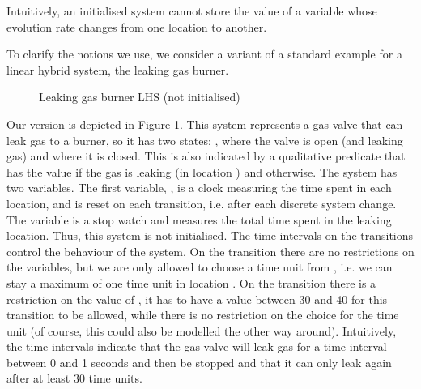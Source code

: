 \documentclass[fleqn,envcountsame]{LMCS}
\newcommand{\ie}{i.e.\xspace}
\begin{document}
Intuitively, an initialised system cannot store the value of a variable
whose evolution rate changes from one location to another.

\begin{exa}
To clarify the notions we use, we consider a variant of a standard example 
for a linear hybrid system, the leaking gas burner.

\begin{figure}
\begin{center}
\end{center}
\caption{Leaking gas burner LHS  (not initialised)}\label{leaking-not-in}
\end{figure}

Our version is depicted in Figure \ref{leaking-not-in}. 
This system represents a gas valve that can leak gas to a burner, so it has
two states: , where the valve is open (and leaking gas) and  where
it is closed. This is also indicated by a qualitative predicate  that
has the value  if the gas is leaking (in location ) and
 otherwise.
The system has two variables. The first variable, , is a clock
measuring the time spent in each location, and is reset on each transition,
\ie after each discrete system change. The variable  is a stop watch
and measures the total time spent in the leaking location.
Thus, this system is not initialised.
The time intervals on the transitions control the behaviour of the system.
On the transition  there are no restrictions on the variables, but
we are only allowed to choose a time unit from , \ie we can stay a
maximum of one time unit in location . On the transition  there 
is a restriction on the value of , it has to have a value between 30
and 40 for this transition to be allowed, while there is no restriction on
the choice for the time unit (of course, this could also be modelled the other
way around).
Intuitively, the time intervals indicate that the gas valve will
leak gas for a time interval between 0 and 1 seconds and 
then be stopped and that it can only leak again after
at least 30 time units.\\


\end{exa}
\end{document}
